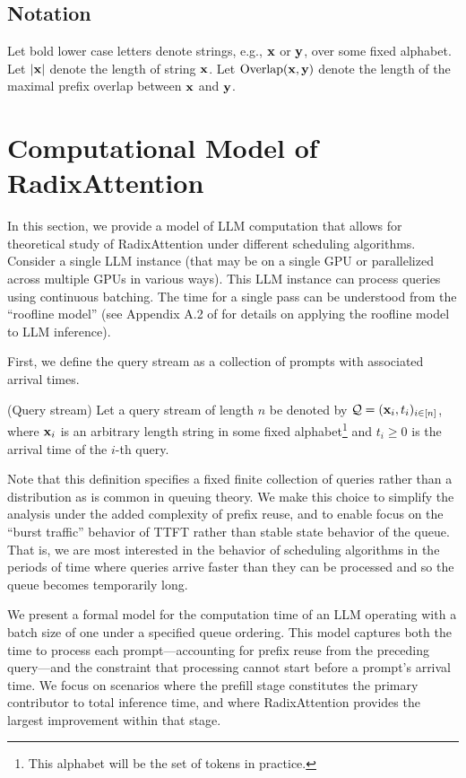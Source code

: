 \subsection{Notation} Let bold lower case letters denote strings, e.g., $\mathbf{x}$ or $\mathbf{y}$, over some fixed alphabet. Let $|\mathbf{x}|$ denote the length of string $\mathbf{x}$. Let $\operatorname{Overlap}(\mathbf{x}, \mathbf{y})$ denote the length of the maximal prefix overlap between $\mathbf{x}$ and $\mathbf{y}$.

\section{Computational Model of RadixAttention}\label{sxn:problem_setting}

In this section, we provide a model of LLM computation that allows for theoretical study of RadixAttention under different scheduling algorithms. Consider a single LLM instance (that may be on a single GPU or parallelized across multiple GPUs in various ways). This LLM instance can process queries using continuous batching. The time for a single pass can be understood from the ``roofline model'' (see Appendix A.2 of \cite{imai2024predicting} for details on applying the roofline model to LLM inference). 

First, we define the query stream as a collection of prompts with associated arrival times. 
\begin{definition}\label{def:query_stream}
    (Query stream) Let a query stream of length $n$ be denoted by $\mathcal{Q} = (\mathbf{x}_i, t_i)_{i \in [n]}$, where $\mathbf{x}_i$ is an arbitrary length string in some fixed alphabet\footnote{This alphabet will be the set of tokens in practice.} and $t_i \geq 0$ is the arrival time of the $i$-th query.
\end{definition}


Note that this definition specifies a fixed finite collection of queries rather than a distribution as is common in queuing theory. We make this choice to simplify the analysis under the added complexity of prefix reuse, and to enable focus on the ``burst traffic'' behavior of TTFT rather than stable state behavior of the queue. That is, we are most interested in the behavior of scheduling algorithms in the periods of time where queries arrive faster than they can be processed and so the queue becomes temporarily long.

We present a formal model for the computation time of an LLM operating with a batch size of one under a specified queue ordering. This model captures both the time to process each prompt---accounting for prefix reuse from the preceding query---and the constraint that processing cannot start before a prompt's arrival time. We focus on scenarios where the prefill stage constitutes the primary contributor to total inference time, and where RadixAttention provides the largest improvement within that stage.

